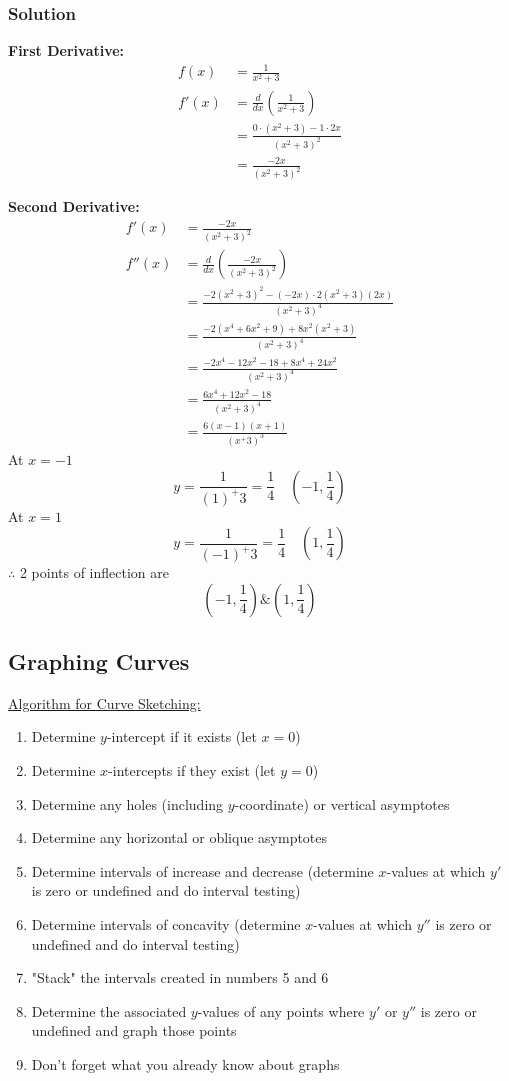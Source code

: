 \documentclass{article}
\begin{document}
\subsubsection*{Solution}
\textbf{First Derivative:}
\begin{align*}
f(x) &= \frac{1}{x^2+3} \\
f'(x) &= \frac{d}{dx} \left(\frac{1}{x^2+3}\right) \\
     &= \frac{0 \cdot (x^2+3) - 1 \cdot 2x}{(x^2+3)^2} \\
     &= \frac{-2x}{(x^2+3)^2}
\end{align*}

\textbf{Second Derivative:}
\begin{align*}
f'(x) &= \frac{-2x}{(x^2+3)^2} \\
f''(x) &= \frac{d}{dx} \left(\frac{-2x}{(x^2+3)^2}\right) \\
      &= \frac{-2(x^2+3)^2 - (-2x) \cdot 2(x^2+3)(2x)}{(x^2+3)^4} \\
      &= \frac{-2(x^4 + 6x^2 + 9) + 8x^2(x^2+3)}{(x^2+3)^4} \\
      &= \frac{-2x^4 - 12x^2 - 18 + 8x^4 + 24x^2}{(x^2+3)^4} \\
      &= \frac{6x^4 + 12x^2 - 18}{(x^2+3)^4}\\
      &=\frac{6(x-1)(x+1)}{(x^+3)^3}
\end{align*}
At $x=-1$
$$y=\frac{1}{(1)^+3}=\frac{1}{4} \quad \left(-1, \frac{1}{4}\right)$$
At $x=1$
$$y=\frac{1}{(-1)^+3}=\frac{1}{4} \quad \left(1, \frac{1}{4}\right)$$
$\therefore$ 2 points of inflection are $$\left(-1, \frac{1}{4}\right) \& \left(1, \frac{1}{4}\right)$$

\subsection{Graphing Curves}
\underline{Algorithm for Curve Sketching:}
\begin{enumerate}
    \item Determine $y$-intercept if it exists (let $x=0$)
    \item Determine $x$-intercepts if they exist (let $y=0$)
    \item Determine any holes (including $y$-coordinate) or vertical asymptotes
    \item Determine any horizontal or oblique asymptotes
    \item Determine intervals of increase and decrease (determine $x$-values at which $y'$ is zero or undefined and do interval testing)
    \item Determine intervals of concavity (determine $x$-values at which $y''$ is zero or undefined and do interval testing)
    \item "Stack" the intervals created in numbers 5 and 6
    \item Determine the associated $y$-values of any points where $y'$ or $y''$ is zero or undefined and graph those points
    \item Don't forget what you already know about graphs \smiley{} 
\end{enumerate}
\end{document}

